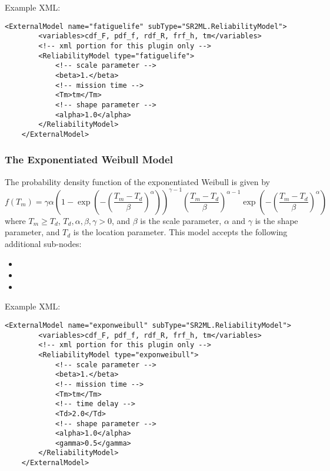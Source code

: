 Example XML:
\begin{lstlisting}[style=XML]
	<ExternalModel name="fatiguelife" subType="SR2ML.ReliabilityModel">
		<variables>cdf_F, pdf_f, rdf_R, frf_h, tm</variables>
		<!-- xml portion for this plugin only -->
		<ReliabilityModel type="fatiguelife">
			<!-- scale parameter -->
			<beta>1.</beta>
			<!-- mission time -->
			<Tm>tm</Tm>
			<!-- shape parameter -->
			<alpha>1.0</alpha>
		</ReliabilityModel>
	</ExternalModel>
\end{lstlisting}


\subsubsection{The Exponentiated Weibull Model}
The probability density function of the exponentiated Weibull is given by
\begin{equation}
	f(T_m) = \gamma\alpha\left(1-\exp\left(-\left(\frac{T_m-T_d}{\beta}\right)^\alpha\right)\right)^{\gamma-1}
				 \left(\frac{T_m-T_d}{\beta}\right)^{\alpha-1}\exp\left(-\left(\frac{T_m-T_d}{\beta}\right)^\alpha\right)
\end{equation}
where $T_m\geq T_d$, $T_d, \alpha, \beta, \gamma>0$, and $\beta$ is the scale parameter, $\alpha$ and $\gamma$ is the shape
parameter, and $T_d$ is the location parameter.
This model accepts the following additional sub-nodes:
\begin{itemize}
	\item {}
	\item {}
	\item {}
\end{itemize}

Example XML:
\begin{lstlisting}[style=XML]
	<ExternalModel name="exponweibull" subType="SR2ML.ReliabilityModel">
		<variables>cdf_F, pdf_f, rdf_R, frf_h, tm</variables>
		<!-- xml portion for this plugin only -->
		<ReliabilityModel type="exponweibull">
			<!-- scale parameter -->
			<beta>1.</beta>
			<!-- mission time -->
			<Tm>tm</Tm>
			<!-- time delay -->
			<Td>2.0</Td>
			<!-- shape parameter -->
			<alpha>1.0</alpha>
			<gamma>0.5</gamma>
		</ReliabilityModel>
	</ExternalModel>
\end{lstlisting}


